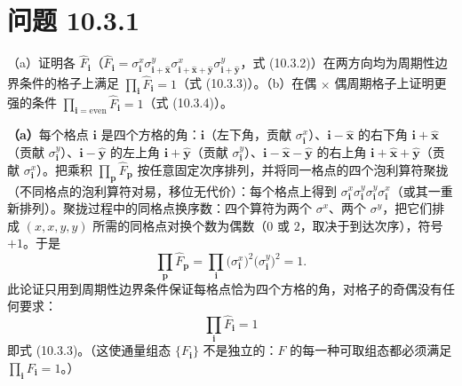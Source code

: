 \section*{问题 10.3.1}
\begin{problem}
（a）证明各 $\hat F_{\pmb i}$（$\hat F_{\pmb i}=\sigma_{\pmb i}^{x}\sigma_{\pmb i+\hat{\pmb x}}^{y}\sigma_{\pmb i+\hat{\pmb x}+\hat{\pmb y}}^{x}\sigma_{\pmb i+\hat{\pmb y}}^{y}$，式 (10.3.2)）在两方向均为周期性边界条件的格子上满足 $\prod_{\pmb i}\hat F_{\pmb i}=1$（式 (10.3.3)）。（b）在偶 $\times$ 偶周期格子上证明更强的条件 $\prod_{\pmb i=\mathrm{even}}\hat F_{\pmb i}=1$（式 (10.3.4)）。
\end{problem}
\solution
\textbf{（a）}每个格点 $\pmb i$ 是四个方格的角：$\pmb i$（左下角，贡献 $\sigma_{\pmb i}^{x}$）、$\pmb i-\hat{\pmb x}$ 的右下角 $\pmb i+\hat{\pmb x}$（贡献 $\sigma_{\pmb i}^{y}$）、$\pmb i-\hat{\pmb y}$ 的左上角 $\pmb i+\hat{\pmb y}$（贡献 $\sigma_{\pmb i}^{y}$）、$\pmb i-\hat{\pmb x}-\hat{\pmb y}$ 的右上角 $\pmb i+\hat{\pmb x}+\hat{\pmb y}$（贡献 $\sigma_{\pmb i}^{x}$）。把乘积 $\prod_{\pmb p}\hat F_{\pmb p}$ 按任意固定次序排列，并将同一格点的四个泡利算符聚拢（不同格点的泡利算符对易，移位无代价）：每个格点上得到 $\sigma_{\pmb i}^{x}\sigma_{\pmb i}^{y}\sigma_{\pmb i}^{y}\sigma_{\pmb i}^{x}$（或其一重新排列）。聚拢过程中的同格点换序数：四个算符为两个 $\sigma^{x}$、两个 $\sigma^{y}$，把它们排成 $(x,x,y,y)$ 所需的同格点对换个数为偶数（$0$ 或 $2$，取决于到达次序），符号 $+1$。于是
\begin{equation*}
\prod_{\pmb p}\hat F_{\pmb p}=\prod_{\pmb i}\big(\sigma_{\pmb i}^{x}\big)^{2}\big(\sigma_{\pmb i}^{y}\big)^{2}=1 .
\end{equation*}
此论证只用到周期性边界条件保证每格点恰为四个方格的角，对格子的奇偶没有任何要求：
\begin{equation*}
\boxed{\;\prod_{\pmb i}\hat F_{\pmb i}=1\;}
\end{equation*}
即式 (10.3.3)。（这使通量组态 $\{F_{\pmb i}\}$ 不是独立的：$F$ 的每一种可取组态都必须满足 $\prod_{\pmb i}F_{\pmb i}=1$。）

